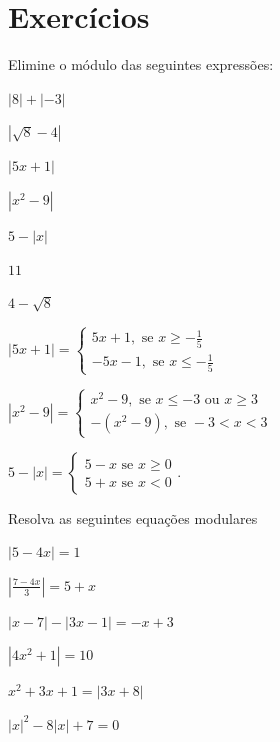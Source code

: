 \section{Exercícios}

\begin{exercises*}

\begin{exercise}
  Elimine o módulo das seguintes expressões:
  \begin{alphalist}
    \item $|8| + |-3|$
    \item $|\sqrt{8}-4|$
    \item $|5x+1|$
    \item $|x^2-9|$
    \item $5-|x|$
  \end{alphalist}

  \begin{answer}
    \begin{alphalist}
      \item $11$
      \item $4-\sqrt{8}$
      \item $|5x+1|=\left\{\begin{array}{ll} 5x+1,
            \text{ se } x \geq -\frac{1}{5}\\-5x-1,
            \text{ se } x \leq -\frac{1}{5}\end{array}\right.$
      \item $|x^2-9|=\left\{\begin{array}{ll} x^2-9,
            \text{ se } x \leq -3
            \text{ ou } x \geq 3\\-(x^2-9),
            \text{ se } -3<x<3\end{array}\right.$
      \item $5-|x|=\left\{\begin{array}{ll} 5-x
            \text{ se } x \geq 0\\5+x
            \text{ se } x < 0\end{array}.\right.$
    \end{alphalist}
  \end{answer}
\end{exercise}

\begin{exercise}
  Resolva as seguintes equações modulares
  \begin{alphalist}
    \item $| 5-4x|=1$
    \item $|\frac{7-4x}{3}|=5+x$
    \item $|x-7|-|3x-1|=-x+3$
    \item $|4x^2+1|=10$
    \item $x^2+3x+1=|3x+8|$
    \item $|x|^2-8|x|+7=0$
  \end{alphalist}


\end{exercise}
\end{exercises*}
